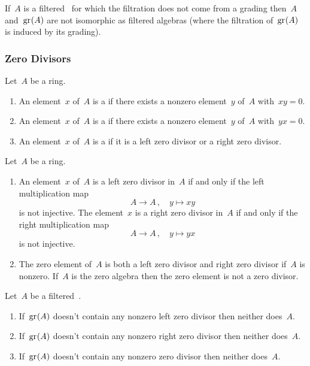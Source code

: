 \begin{warning}
  If~$A$ is a filtered~{\algebra{$\kf$}} for which the filtration does not come from a grading then~$A$ and~$\gr(A)$ are not isomorphic as filtered algebras (where the filtration of~$\gr(A)$ is induced by its grading).
\end{warning}

\subsubsection{Zero Divisors}

\begin{definition}
  Let~$A$ be a ring.
  \begin{enumerate}
    \item
      An element~$x$ of~$A$ is a  if there exists a nonzero element~$y$ of~$A$ with~$xy = 0$.
    \item
      An element~$x$ of~$A$ is a  if there exists a nonzero element~$y$ of~$A$ with~$yx = 0$.
    \item
      An element~$x$ of~$A$ is a  if it is a left zero divisor or a right zero divisor.
  \end{enumerate}
\end{definition}


\begin{remark}
  Let~$A$ be a ring.
  \begin{enumerate}
    \item
      An element~$x$ of~$A$ is a left zero divisor in~$A$ if and only if the left multiplication map
      \[
        A \to A \,,
        \quad
        y \mapsto xy
      \]
      is not injective.
      The element~$x$ is a right zero divisor in~$A$ if and only if the right multiplication map
      \[
        A \to A \,,
        \quad
        y \mapsto yx
      \]
      is not injective.
    \item
      The zero element of~$A$ is both a left zero divisor and right zero divisor if~$A$ is nonzero.
      If~$A$ is the zero algebra then the zero element is not a zero divisor.
  \end{enumerate}
\end{remark}


\begin{proposition}
  \label{associated graded algebra and zero divisors}
  Let~$A$ be a filtered~{\algebra{$\kf$}}.
  \begin{enumerate}
    \item
      \label{associated graded has left zero divisors}
      If~$\gr(A)$ doesn’t contain any nonzero left zero divisor then neither does~$A$.
    \item
      \label{associated graded has right zero divisors}
      If~$\gr(A)$ doesn’t contain any nonzero right zero divisor then neither does~$A$.
    \item
      If~$\gr(A)$ doesn’t contain any nonzero zero divisor then neither does~$A$.
  \end{enumerate}
\end{proposition}



